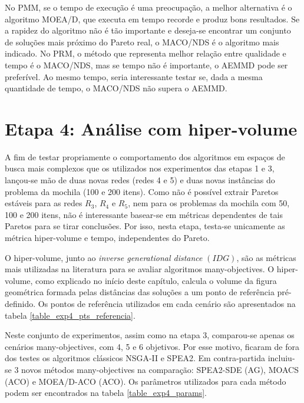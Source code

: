 No PMM, se o tempo de execução é uma preocupação, a melhor alternativa é o algoritmo MOEA/D, que executa em tempo recorde e produz bons resultados. Se a rapidez do algoritmo não é tão importante e deseja-se encontrar um conjunto de soluções mais próximo do Pareto real, o MACO/NDS é o algoritmo mais indicado. No PRM, o método que representa melhor relação entre qualidade e tempo é o MACO/NDS, mas se tempo não é importante, o AEMMD pode ser preferível. Ao mesmo tempo, seria interessante testar se, dada a mesma quantidade de tempo, o MACO/NDS não supera o AEMMD.

\section{Etapa 4: Análise com hiper-volume}
\label{section_experimentos_etapa4}

A fim de testar propriamente o comportamento dos algoritmos em espaços de busca mais complexos que os utilizados nos experimentos das etapas 1 e 3, lançou-se mão de duas novas redes (redes 4 e 5) e duas novas instâncias do problema da mochila (100 e 200 itens). Como não é possível extrair Paretos estáveis para as redes $R_3$, $R_4$ e $R_5$, nem para os problemas da mochila com 50, 100 e 200 itens, não é interessante basear-se em métricas dependentes de tais Paretos para se tirar conclusões. Por isso, nesta etapa, testa-se unicamente as métrica hiper-volume e tempo, independentes do Pareto.

O hiper-volume, junto ao \textit{inverse generational distance} $(IDG)$, são as métricas mais utilizadas na literatura para se avaliar algoritmos many-objectives. O hiper-volume, como explicado no início deste capítulo, calcula o volume da figura geométrica formada pelas distâncias das soluções a um ponto de referência pré-definido. Os pontos de referência utilizados em cada cenário são apresentados na tabela \ref{table_exp4_pts_referencia}.

Neste conjunto de experimentos, assim como na etapa 3, comparou-se apenas os cenários many-objectives, com 4, 5 e 6 objetivos. Por esse motivo, ficaram de fora dos testes os algoritmos clássicos NSGA-II e SPEA2. Em contra-partida incluiu-se 3 novos métodos many-objectives na comparação: SPEA2-SDE (AG), MOACS (ACO) e MOEA/D-ACO (ACO). Os parâmetros utilizados para cada método podem ser encontrados na tabela \ref{table_exp4_params}.

